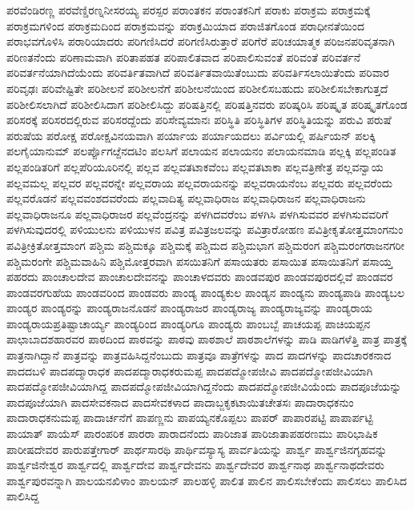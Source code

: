 {ಪರವೆಂಡಿರಣ್ಣ
ಪರವೆಣ್ಡಿರಣ್ನನೀಸರಯ್ಯ
ಪರಸ್ಪರ
ಪರಾಂತಕನ
ಪರಾಂತಕನಿಗೆ
ಪರಾಕು
ಪರಾಕ್ರಮ
ಪರಾಕ್ರಮಕ್ಕೆ
ಪರಾಕ್ರಮಗಳಿಂದ
ಪರಾಕ್ರಮದಿಂದ
ಪರಾಕ್ರಮವನ್ನು
ಪರಾಕ್ರಮಿಯಾದ
ಪರಾಜಿತಗೊಂಡ
ಪರಾಧೀನತೆಯಿಂದ
ಪರಾಭವಗೊಳಿಸಿ
ಪರಾರಿಯಾದರು
ಪರಿಗಣಿಸಿದರೆ
ಪರಿಗಣಿಸಿರುತ್ತಾರೆ
ಪರಿಗೆರೆ
ಪರಿಚಯಾತ್ಮಕ
ಪರಿಜನಪರಿವೃತನಾಗಿ
ಪರಿಣತನೆಂದು
ಪರಿಣಾಮವಾಗಿ
ಪರಿತಾಪಹತ
ಪರಿಪಾಲಿತವಾದ
ಪರಿಪಾಲಿಸುವಂತೆ
ಪರಿವಂತೆ
ಪರಿವರ್ತನೆ
ಪರಿವರ್ತನೆಯಾಗಿದೆಯೆಂದು
ಪರಿವರ್ತಿತವಾಗಿದೆ
ಪರಿವರ್ತಿತವಾಯಿತೆಂಬುದು
ಪರಿವರ್ತಿಸಲಾಯಿತೆಂದು
ಪರಿವಾರ
ಪರಿವೃಢಃ
ಪರಿವೇಷ್ಟಿತೇ
ಪರಿಶೀಲನೆ
ಪರಿಶೀಲನೆಗೆ
ಪರಿಶೀಲನೆಯಿಂದ
ಪರಿಶೀಲಿಸಬಹುದು
ಪರಿಶೀಲಿಸಬೇಕಾಗುತ್ತದೆ
ಪರಿಶೀಲಿಸಲಾಗಿದೆ
ಪರಿಶೀಲಿಸಿದಾಗ
ಪರಿಶೀಲಿಸಿದ್ದು
ಪರಿಷತ್ತಿನಲ್ಲಿ
ಪರಿಷತ್ತಿನವರು
ಪರಿಷ್ಕರಿಸಿ
ಪರಿಷ್ಕೃತ
ಪರಿಷ್ಕೃತಗೊಂಡ
ಪರಿಸರಕ್ಕೆ
ಪರಿಸರದಲ್ಲಿರುವ
ಪರಿಸರದ್ದೆಂದು
ಪರಿಸೇವ್ಯಮಾನಃ
ಪರಿಸ್ಥಿತಿ
ಪರಿಸ್ಥಿತಿಗಳ
ಪರಿಸ್ಥಿತಿಯನ್ನು
ಪರುವಿ
ಪರುಷೆ
ಪರುಷೆಯ
ಪರೋಕ್ಷ
ಪರೋಕ್ಷವಿನಯವಾಗಿ
ಪರ್ಯಾಯ
ಪರ್ಯಾಯದಲು
ಪರ್ವಿಯಲ್ಲಿ
ಪರ್ಷಿಯನ್
ಪಲಕ್ಕಿ
ಪಲಗೈಯಾನುಮ್
ಪಲರ್ಪ್ಪೊಗೞ್ದೆನದಟಿಂ
ಪಲಸಿಗೆ
ಪಲಾಯನ
ಪಲಾಯನಂ
ಪಲಾಯನಮಾಡಿ
ಪಲ್ಲಕ್ಕಿ
ಪಲ್ಲಪಂಡಿತ
ಪಲ್ಲಪಂಡಿತರಿಗೆ
ಪಲ್ಲಪೆರಿಯೂರಿನಲ್ಲಿ
ಪಲ್ಲವ
ಪಲ್ಲವತಟಾಕವೆಂಬ
ಪಲ್ಲವತಟಾಕಾ
ಪಲ್ಲವತ್ರಿಣೇತ್ರ
ಪಲ್ಲವನ್ವಾಯ
ಪಲ್ಲವಮಲ್ಲ
ಪಲ್ಲವರ
ಪಲ್ಲವರನ್ನೇ
ಪಲ್ಲವರಾಯ
ಪಲ್ಲವರಾಯನನ್ನು
ಪಲ್ಲವರಾಯನೆಂಬ
ಪಲ್ಲವರು
ಪಲ್ಲವರೆಂದು
ಪಲ್ಲವರೊಡನೆ
ಪಲ್ಲವವಂಶದವರೆಂದು
ಪಲ್ಲವಾದಿತ್ಯ
ಪಲ್ಲವಾಧಿರಾಜ
ಪಲ್ಲವಾಧಿರಾಜನ
ಪಲ್ಲವಾಧಿರಾಜನು
ಪಲ್ಲವಾಧಿರಾಜನೂ
ಪಲ್ಲವಾಧಿರಾಜರ
ಪಲ್ಲವೆಂದ್ರನನ್ನು
ಪಳಗಿದವರೆಂಬ
ಪಳಗಿಸಿ
ಪಳಗಿಸುವವರ
ಪಳಗಿಸುವವರಿಗೆ
ಪಳಗಿಸುವುದರಲ್ಲಿ
ಪಳಿಯುಲನು
ಪಳಿಯುಳನ
ಪವಿತ್ರ
ಪವಿತ್ರಜಲವನ್ನು
ಪವಿತ್ರಾರೋಹಣ
ಪವಿತ್ರೀಕೃತೋತ್ತಮಾಂಗನುಂ
ಪವಿತ್ರೀಕ್ರಿತೋತ್ತಮಾಂಗ
ಪಶ್ಚಿಮ
ಪಶ್ಚಿಮಕ್ಕೂ
ಪಶ್ಚಿಮಕ್ಕೆ
ಪಶ್ಚಿಮದ
ಪಶ್ಚಿಮಭಾಗ
ಪಶ್ಚಿಮರಂಗ
ಪಶ್ಚಿಮರಂಗರಾಜನಗರೀ
ಪಶ್ಚಿಮರಂಗೇ
ಪಶ್ಚಿಮವಾಹಿನಿ
ಪಶ್ಚಿಮೋತ್ತರವಾಗಿ
ಪಸಯಿತನಿಗೆ
ಪಸಾಯತರು
ಪಸಾಯಿತ
ಪಸಾಯಿತನಿಗೆ
ಪಸಾಯ್ತ
ಪಹರದು
ಪಾಂಚಾಲದೇವ
ಪಾಂಚಾಲದೇವನನ್ನು
ಪಾಂಚಾಳದವರು
ಪಾಂಡವಪುರ
ಪಾಂಡವಪುರದಲ್ಲಿವೆ
ಪಾಂಡವರ
ಪಾಂಡವರಗುಹೆಯ
ಪಾಂಡವರಿಂದ
ಪಾಂಡವರು
ಪಾಂಡ್ಯ
ಪಾಂಡ್ಯಕುಲ
ಪಾಂಡ್ಯನ
ಪಾಂಡ್ಯನು
ಪಾಂಡ್ಯಪಾಡಿ
ಪಾಂಡ್ಯಬಲ
ಪಾಂಡ್ಯರ
ಪಾಂಡ್ಯರನ್ನು
ಪಾಂಡ್ಯರಾಜನೊಡನೆ
ಪಾಂಡ್ಯರಾಜರ
ಪಾಂಡ್ಯರಾಜ್ಯ
ಪಾಂಡ್ಯರಾಜ್ಯವನ್ನು
ಪಾಂಡ್ಯರಾಯ
ಪಾಂಡ್ಯರಾಯಪ್ರತಿಷ್ಟಾಚಾರ್ಯ್ಯ
ಪಾಂಡ್ಯರಿಂದ
ಪಾಂಡ್ಯರಿಗೂ
ಪಾಂಡ್ಯರು
ಪಾಂಬಬ್ಬೆ
ಪಾಚಯಪ್ಪ
ಪಾಚಿಯಪ್ಪನ
ಪಾಛಾಬಾದಶಹಾರವರ
ಪಾಠದಿಂದ
ಪಾಠವನ್ನು
ಪಾಠವು
ಪಾಠಶಾಲೆ
ಪಾಠಶಾಲೆಗಳನ್ನು
ಪಾಡಿ
ಪಾಡಿಗಳೆತ್ತಿ
ಪಾತ್ರ
ಪಾತ್ರಕ್ಕೆ
ಪಾತ್ರನಾಗಿದ್ದಾನೆ
ಪಾತ್ರವನ್ನು
ಪಾತ್ರವಹಿಸಿದ್ದನೆಂಬುದು
ಪಾತ್ರವೂ
ಪಾತ್ರೆಗಳನ್ನು
ಪಾದ
ಪಾದಗಳನ್ನು
ಪಾದಚಾರಕನಾದ
ಪಾದದಬಳಿ
ಪಾದಪದ್ಮಾರಾಧಕ
ಪಾದಪದ್ಮಾರಾಧಕರುಮಪ್ಪ
ಪಾದಪದ್ಮೋಪಜೀವಿ
ಪಾದಪದ್ಮೋಪಜೀವಿಯಾಗಿ
ಪಾದಪದ್ಮೋಪಜೀವಿಯಾಗಿದ್ದ
ಪಾದಪದ್ಮೋಪಜೀವಿಯಾಗಿದ್ದನೆಂದು
ಪಾದಪದ್ಮೋಪಜೀವಿಯೆಂದು
ಪಾದಪೂಜೆಯನ್ನು
ಪಾದಪೂಜೆಯಾಗಿ
ಪಾದಸೇವಕನಾದ
ಪಾದಸೇವಕಳಾದ
ಪಾದಾಬ್ಜಕೃಕಟಾಯಿತಚೇತಸಃ
ಪಾದಾರಾಧಕನುಂ
ಪಾದಾರಾಧಕನುಮಪ್ಪ
ಪಾದಾರ್ಚನೆಗೆ
ಪಾಪಣ್ಣನು
ಪಾಪಯ್ಯನಕೊಪ್ಪಲು
ಪಾಪರ್
ಪಾಪಾರಪಟ್ಟಿ
ಪಾಪಾರ್ಪಟ್ಟಿ
ಪಾಯಾತ್
ಪಾಯೆಸ್
ಪಾರಂಪರಿಕ
ಪಾರರಾ
ಪಾರಾದನೆಂದು
ಪಾರಿಜಾತ
ಪಾರಿಜಾತಾಪಹರಣಮು
ಪಾರಿಭಾಷಿಕ
ಪಾರೀಷದೇವರ
ಪಾರುಪತ್ತೇಗಾರ್
ಪಾರ್ಥಸಾರಥಿ
ಪಾರ್ಥಿವಸ್ಯಾಸ್ಯ
ಪಾರ್ವತಿಯನ್ನು
ಪಾರ್ಶ್ವ
ಪಾರ್ಶ್ವಜಿನಗೃಹವನ್ನು
ಪಾರ್ಶ್ವಜಿನೇಶ್ವರ
ಪಾರ್ಶ್ವದಲ್ಲಿ
ಪಾರ್ಶ್ವದೇವ
ಪಾರ್ಶ್ವದೇವನು
ಪಾರ್ಶ್ವದೇವರ
ಪಾರ್ಶ್ವನಾಥ
ಪಾರ್ಶ್ವನಾಥದೇವರು
ಪಾರ್ಶ್ವಪುರವನ್ನಾಗಿ
ಪಾಲಯನಖಿಳಾಂ
ಪಾಲಯನ್
ಪಾಲಹಳ್ಳಿ
ಪಾಲಿತ
ಪಾಲಿನ
ಪಾಲಿಸಬೇಕೆಂದು
ಪಾಲಿಸಲು
ಪಾಲಿಸಿದ
ಪಾಲಿಸಿದ್ದ
}
